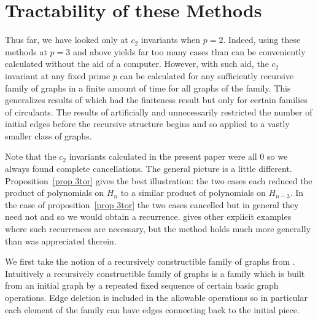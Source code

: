 \documentclass[12pt]{amsart}
\numberwithin{definition}{section}
\begin{document}
\section{Tractability of these Methods}
Thus far, we have looked only at $c_2$ invariants when $p=2$. Indeed, using these methods at $p=3$ and above yields far too many cases than can be conveniently calculated without the aid of a computer. However, with such aid, the $c_2$ invariant at any fixed prime $p$ can be calculated for any sufficiently recursive family of graphs in a finite amount of time for all graphs of the family.  This generalizes results of \cite{Yeats2016} which had the finiteness result but only for certain families of circulants.  The results of \cite{Yeats2016} artificially and unnecessarily restricted the number of initial edges before the recursive structure begins and so applied to a vastly smaller class of graphs.

Note that the $c_2$ invariants calculated in the present paper were all $0$ so we always found complete cancellations.  The general picture is a little different.  Proposition~\ref{prop 3tor} gives the best illustration: the two cases each reduced the product of polynomials on $H_n$ to a similar product of polynomials on $H_{n-3}$.  In the case of proposition~\ref{prop 3tor} the two cases cancelled but in general they need not and so we would obtain a recurrence.  \cite{Yeats2016} gives other explicit examples where such recurrences are necessary, but the method holds much more generally than was appreciated therein.

We first take the notion of a recursively constructible family of graphs from \cite{NoyRibo2004}.  Intuitively a recursively constructible family of graphs is a family which is built from an initial graph by a repeated fixed sequence of certain basic graph operations.  Edge deletion is included in the allowable operations so in particular each element of the family can have edges connecting back to the initial piece.
\end{document}

